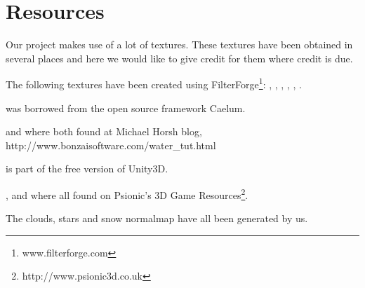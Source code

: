 \chapter{Resources}

Our project makes use of a lot of textures. These textures have been
obtained in several places and here we would like to give credit for
them where credit is due.

The following textures have been created using
FilterForge\footnote{www.filterforge.com}: ,
, ,
, ,
.

 was borrowed from the open source framework
Caelum.

 and  where both
found at Michael Horsh blog,
http://www.bonzaisoftware.com/water\_tut.html

 is part of the free version of Unity3D.

,  and 
where all found on Psionic's 3D Game
Resources\footnote{http://www.psionic3d.co.uk}.

The clouds, stars and snow normalmap have all been generated by us.
